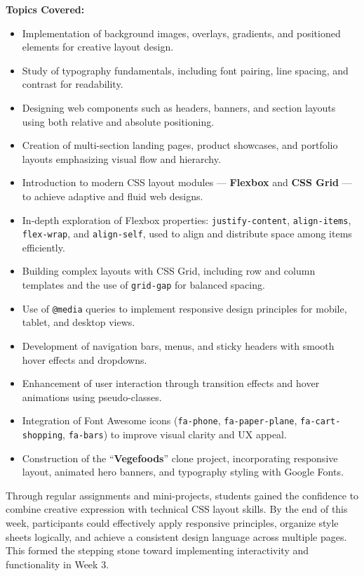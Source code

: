 \documentclass[a4paper,12pt,oneside]{report}
\numberwithin{equation}{chapter}
\numberwithin{figure}{chapter}
\numberwithin{table}{chapter}
\begin{document}
\textbf{Topics Covered:}
\begin{itemize}
    \item Implementation of background images, overlays, gradients, and positioned elements for creative layout design.
    \item Study of typography fundamentals, including font pairing, line spacing, and contrast for readability.
    \item Designing web components such as headers, banners, and section layouts using both relative and absolute positioning.
    \item Creation of multi-section landing pages, product showcases, and portfolio layouts emphasizing visual flow and hierarchy.
    \item Introduction to modern CSS layout modules — \textbf{Flexbox} and \textbf{CSS Grid} — to achieve adaptive and fluid web designs.
    \item In-depth exploration of Flexbox properties: \texttt{justify-content}, \texttt{align-items}, \texttt{flex-wrap}, and \texttt{align-self}, used to align and distribute space among items efficiently.
    \item Building complex layouts with CSS Grid, including row and column templates and the use of \texttt{grid-gap} for balanced spacing.
    \item Use of \texttt{@media} queries to implement responsive design principles for mobile, tablet, and desktop views.
    \item Development of navigation bars, menus, and sticky headers with smooth hover effects and dropdowns.
    \item Enhancement of user interaction through transition effects and hover animations using pseudo-classes.
    \item Integration of Font Awesome icons (\texttt{fa-phone}, \texttt{fa-paper-plane}, \texttt{fa-cart-shopping}, \texttt{fa-bars}) to improve visual clarity and UX appeal.
    \item Construction of the “\textbf{Vegefoods}” clone project, incorporating responsive layout, animated hero banners, and typography styling with Google Fonts.
\end{itemize}

Through regular assignments and mini-projects, students gained the confidence to combine creative expression with technical CSS layout skills. By the end of this week, participants could effectively apply responsive principles, organize style sheets logically, and achieve a consistent design language across multiple pages. This formed the stepping stone toward implementing interactivity and functionality in Week 3.
\end{document}
